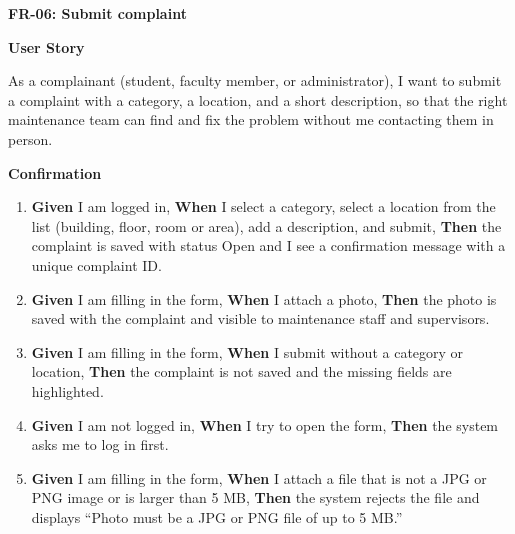\noindent\textbf{FR-06: Submit complaint}\par\nopagebreak[4]\smallskip
\noindent\textbf{User Story}\par\nopagebreak[4]
\noindent As a complainant (student, faculty member, or administrator), I want to submit a complaint with a category, a location, and a short description, so that the right maintenance team can find and fix the problem without me contacting them in person.\par\smallskip
{\makeatletter
{}
\makeatother
\noindent\textbf{Confirmation}\par\nopagebreak[4]\vspace{-6pt}\nopagebreak[4]
\begin{enumerate}\setlength{\itemsep}{2pt}\setlength{\parsep}{0pt}\setlength{\topsep}{2pt}\setlength{\partopsep}{0pt}
  \item \textbf{Given} I am logged in, \textbf{When} I select a category, select a location from the list (building, floor, room or area), add a description, and submit, \textbf{Then} the complaint is saved with status Open and I see a confirmation message with a unique complaint ID.
  \item \textbf{Given} I am filling in the form, \textbf{When} I attach a photo, \textbf{Then} the photo is saved with the complaint and visible to maintenance staff and supervisors.
  \item \textbf{Given} I am filling in the form, \textbf{When} I submit without a category or location, \textbf{Then} the complaint is not saved and the missing fields are highlighted.
  \item \textbf{Given} I am not logged in, \textbf{When} I try to open the form, \textbf{Then} the system asks me to log in first.
  \item \textbf{Given} I am filling in the form, \textbf{When} I attach a file that is not a JPG or PNG image or is larger than 5 MB, \textbf{Then} the system rejects the file and displays ``Photo must be a JPG or PNG file of up to 5 MB.''
\end{enumerate}}
\medskip
 
